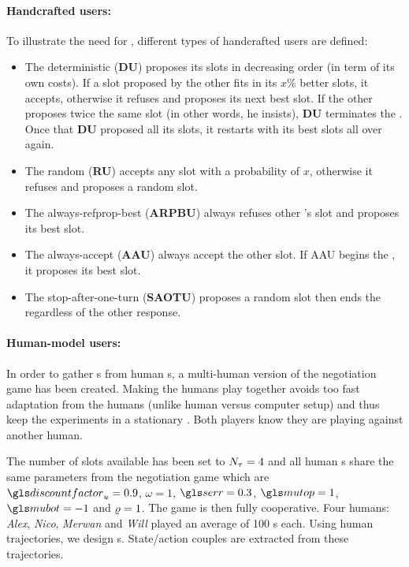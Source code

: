\paragraph{Handcrafted users:} To illustrate the need for , different types of handcrafted users are defined:
\begin{itemize}
    \item The deterministic  (\textbf{DU}) proposes its slots in decreasing order (in term of its own costs). If a slot proposed by the other  fits in its $x\%$ better slots, it accepts, otherwise it refuses and proposes its next best slot. If the other  proposes twice the same slot (in other words, he insists), \textbf{DU} terminates the . Once that \textbf{DU} proposed all its slots, it restarts with its best slots all over again.
    \item The random  (\textbf{RU}) accepts any slot with a probability of $x$, otherwise it refuses and proposes a random slot.
    \item The always-refprop-best  (\textbf{ARPBU})  always refuses other 's slot and proposes its best slot.
    \item The always-accept  (\textbf{AAU}) always accept the other  slot. If AAU begins the , it proposes its best slot.
    \item The stop-after-one-turn  (\textbf{SAOTU}) proposes a random slot then ends the  regardless of the other  response.
\end{itemize}

\paragraph{Human-model users:} In order to gather s from human s, a multi-human version of the negotiation game has been created. Making the humans play together avoids too fast adaptation from the humans (unlike human versus computer setup) and thus keep the experiments in a stationary . Both players know they are playing against another human.

The number of slots available has been set to $N_{\tau}=4$ and all human s share the same parameters from the negotiation game which are $\discountfactor_u = 0.9$, $\omega = 1$, $\ser=0.3$, $ \mutop=1$, $\mubot= -1$ and $\varrho=1$. The game is then fully cooperative. Four humans: \textit{Alex}, \textit{Nico}, \textit{Merwan} and \textit{Will} played an average of 100 s each. Using human trajectories, we design s. State/action couples are extracted from these trajectories.

